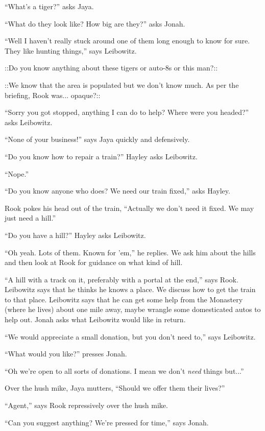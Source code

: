 ``What's a tiger?'' asks Jaya.

``What do they look like?  How big are they?'' asks Jonah.

``Well I haven't really stuck around one of them long enough to know for sure.  They like hunting things,'' says Leibowitz.

 {\color[RGB]{255,153,0}::Do you know anything about these tigers or auto-8s or this man?::} 

 {\color[RGB]{153,0,255}::We know that the area is populated but we don't know much.  As per the briefing, Rook was... opaque?::} 

``Sorry you got stopped, anything I can do to help?  Where were you headed?'' asks Leibowitz.

``None of your business!'' says Jaya quickly and defensively.

``Do you know how to repair a train?'' Hayley asks Leibowitz.

``Nope.''

``Do you know anyone who does?  We need our train fixed,'' asks Hayley.

Rook pokes his head out of the train, ``Actually we don't need it fixed.  We may just need a hill.''

``Do you have a hill?'' Hayley asks Leibowitz.

``Oh yeah.  Lots of them.  Known for 'em,'' he replies.  We ask him about the hills and then look at Rook for guidance on what kind of hill.

``A hill with a track on it, preferably with a portal at the end,'' says Rook.  Leibowitz says that he thinks he knows a place.  We discuss how to get the train to that place.  Leibowitz says that he can get some help from the Monastery (where he lives) about one mile away, maybe wrangle some domesticated autos to help out.  Jonah asks what Leibowitz would like in return.

``We would appreciate a small donation, but you don't need to,'' says Leibowitz.

``What would you like?'' presses Jonah.

``Oh we're open to all sorts of donations. I mean we don't \textit{need} things but...''

Over the hush mike, Jaya mutters, ``Should we offer them their lives?''

``Agent,'' says Rook repressively over the hush mike.  

``Can you suggest anything? We're pressed for time,'' says Jonah.

